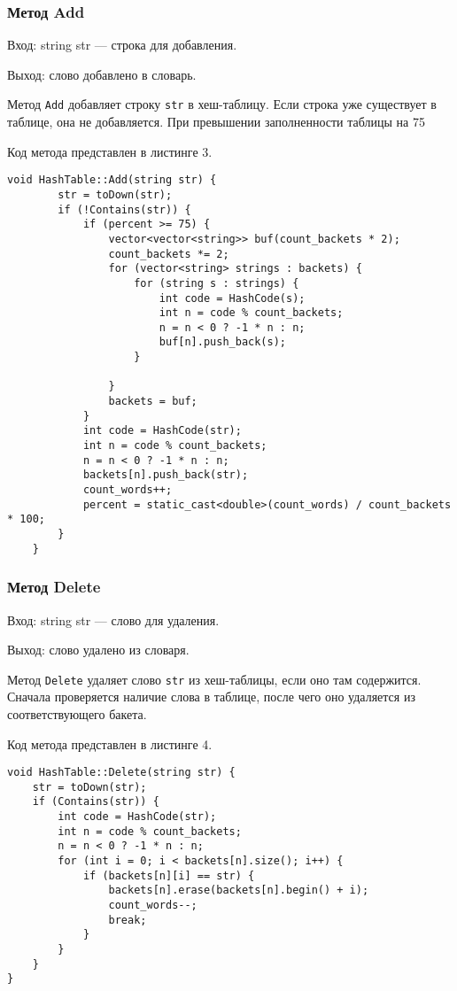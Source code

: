 \documentclass[10pt,a4paper,final]{article} %
\begin{document}
\subsubsection{Метод Add}
Вход: string str — строка для добавления. \par
Выход: слово добавлено в словарь. \par
\par Метод \texttt{Add} добавляет строку \texttt{str} в хеш-таблицу. Если строка уже существует в таблице, она не добавляется. При превышении заполненности таблицы на 75%

Код метода представлен в листинге 3. \begin{lstlisting}[label=addMethod, caption = Метод Add]
	void HashTable::Add(string str) {
		str = toDown(str);
		if (!Contains(str)) {
			if (percent >= 75) {
				vector<vector<string>> buf(count_backets * 2);
				count_backets *= 2;
				for (vector<string> strings : backets) {
					for (string s : strings) {
						int code = HashCode(s);
						int n = code % count_backets;
						n = n < 0 ? -1 * n : n;
						buf[n].push_back(s);
					}
					
				}
				backets = buf;
			}
			int code = HashCode(str);
			int n = code % count_backets;
			n = n < 0 ? -1 * n : n;
			backets[n].push_back(str);
			count_words++;
			percent = static_cast<double>(count_words) / count_backets * 100;
		}
	} \end{lstlisting}



\subsubsection{Метод Delete}
Вход: string str — слово для удаления. \par
Выход: слово удалено из словаря. \par
\par Метод \texttt{Delete} удаляет слово \texttt{str} из хеш-таблицы, если оно там содержится. Сначала проверяется наличие слова в таблице, после чего оно удаляется из соответствующего бакета.

Код метода представлен в листинге 4. \begin{lstlisting}[label=deleteMethod, caption = Метод Delete] 
void HashTable::Delete(string str) {
	str = toDown(str);
	if (Contains(str)) {
		int code = HashCode(str);
		int n = code % count_backets;
		n = n < 0 ? -1 * n : n;
		for (int i = 0; i < backets[n].size(); i++) {
			if (backets[n][i] == str) {
				backets[n].erase(backets[n].begin() + i);
				count_words--;
				break;
			}
		}
	}
} \end{lstlisting}
\end{document}

